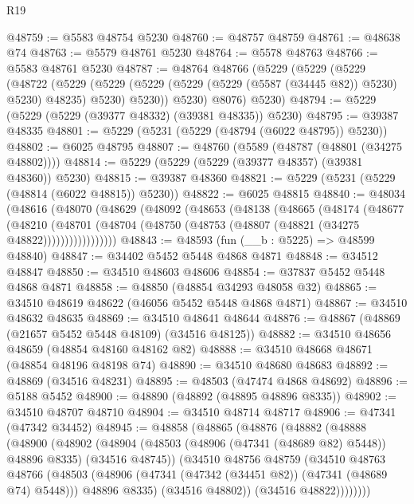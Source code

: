 \begin{lexlean}{R19}
\begin{coremodule}
@48759 := @5583 @48754 @5230
@48760 := @48757 @48759
@48761 := @48638 @74
@48763 := @5579 @48761 @5230
@48764 := @5578 @48763
@48766 := @5583 @48761 @5230
@48787 := @48764
    @48766
    (@5229
      (@5229
        (@5229
          (@48722
            (@5229
              (@5229 (@5229 (@5229 (@5229 (@5587 (@34445 @82)) @5230) @5230) @48235) @5230)
              @5230))
          @5230)
        @8076)
      @5230)
@48794 := @5229 (@5229 (@5229 (@39377 @48332) (@39381 @48335)) @5230)
@48795 := @39387 @48335
@48801 := @5229 (@5231 (@5229 (@48794 (@6022 @48795)) @5230))
@48802 := @6025 @48795
@48807 := @48760 (@5589 (@48787 (@48801 (@34275 @48802))))
@48814 := @5229 (@5229 (@5229 (@39377 @48357) (@39381 @48360)) @5230)
@48815 := @39387 @48360
@48821 := @5229 (@5231 (@5229 (@48814 (@6022 @48815)) @5230))
@48822 := @6025 @48815
@48840 := @48034
    (@48616
      (@48070
        (@48629
          (@48092
            (@48653
              (@48138
                (@48665
                  (@48174
                    (@48677
                      (@48210
                        (@48701
                          (@48704 (@48750 (@48753 (@48807 (@48821 (@34275 @48822)))))))))))))))))
@48843 := @48593 (fun (__b : @5225) => @48599 @48840)
@48847 := @34402 @5452 @5448 @4868 @4871
@48848 := @34512 @48847
@48850 := @34510 @48603 @48606
@48854 := @37837 @5452 @5448 @4868 @4871
@48858 := @48850 (@48854 @34293 @48058 @32)
@48865 := @34510 @48619 @48622 (@46056 @5452 @5448 @4868 @4871)
@48867 := @34510 @48632 @48635
@48869 := @34510 @48641 @48644
@48876 := @48867 (@48869 (@21657 @5452 @5448 @48109) (@34516 @48125))
@48882 := @34510 @48656 @48659 (@48854 @48160 @48162 @82)
@48888 := @34510 @48668 @48671 (@48854 @48196 @48198 @74)
@48890 := @34510 @48680 @48683
@48892 := @48869 (@34516 @48231)
@48895 := @48503 (@47474 @4868 @48692)
@48896 := @5188 @5452
@48900 := @48890 (@48892 (@48895 @48896 @8335))
@48902 := @34510 @48707 @48710
@48904 := @34510 @48714 @48717
@48906 := @47341 (@47342 @34452)
@48945 := @48858
    (@48865
      (@48876
        (@48882
          (@48888
            (@48900
              (@48902
                (@48904 (@48503 (@48906 (@47341 (@48689 @82) @5448)) @48896 @8335) (@34516 @48745))
                (@34510
                  @48756
                  @48759
                  (@34510
                    @48763
                    @48766
                    (@48503
                      (@48906 (@47341 (@47342 (@34451 @82)) (@47341 (@48689 @74) @5448)))
                      @48896
                      @8335)
                    (@34516 @48802))
                  (@34516 @48822))))))))

\end{coremodule}
\end{lexlean}
